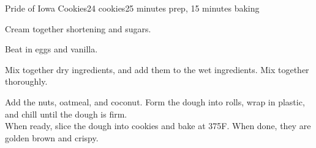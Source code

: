 \documentclass[../Cookbook.tex]{subfiles}
\begin{document}
\begin{recipe}{Pride of Iowa Cookies}{24 cookies}{25 minutes prep, 15 minutes baking}

	Cream together shortening and sugars.

	Beat in eggs and vanilla.

	Mix together dry ingredients, and add them to the wet ingredients. Mix together thoroughly.

	Add the nuts, oatmeal, and coconut. Form the dough into rolls, wrap in plastic, and chill until the dough is firm.\\
	When ready, slice the dough into cookies and bake at 375\0F. When done, they are golden brown and crispy.

\end{recipe}
\end{document}
